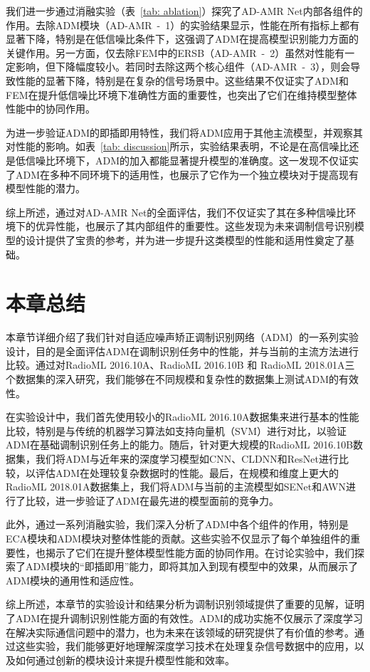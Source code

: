 我们进一步通过消融实验（表~\ref{tab: ablation}）探究了AD-AMR Net内部各组件的作用。去除ADM模块（AD-AMR~-~1）的实验结果显示，性能在所有指标上都有显著下降，特别是在低信噪比条件下，这强调了ADM在提高模型识别能力方面的关键作用。另一方面，仅去除FEM中的ERSB（AD-AMR~-~2）虽然对性能有一定影响，但下降幅度较小。若同时去除这两个核心组件（AD-AMR~-~3），则会导致性能的显著下降，特别是在复杂的信号场景中。这些结果不仅证实了ADM和FEM在提升低信噪比环境下准确性方面的重要性，也突出了它们在维持模型整体性能中的协同作用。

为进一步验证ADM的即插即用特性，我们将ADM应用于其他主流模型，并观察其对性能的影响。如表~\ref{tab: discussion}所示，实验结果表明，不论是在高信噪比还是低信噪比环境下，ADM的加入都能显著提升模型的准确度。这一发现不仅证实了ADM在多种不同环境下的适用性，也展示了它作为一个独立模块对于提高现有模型性能的潜力。

综上所述，通过对AD-AMR Net的全面评估，我们不仅证实了其在多种信噪比环境下的优异性能，也展示了其内部组件的重要性。这些发现为未来调制信号识别模型的设计提供了宝贵的参考，并为进一步提升这类模型的性能和适用性奠定了基础。

\section{本章总结}\label{sec:background}
本章节详细介绍了我们针对自适应噪声矫正调制识别网络（ADM）的一系列实验设计，目的是全面评估ADM在调制识别任务中的性能，并与当前的主流方法进行比较。通过对RadioML 2016.10A、RadioML 2016.10B 和 RadioML 2018.01A三个数据集的深入研究，我们能够在不同规模和复杂性的数据集上测试ADM的有效性。

在实验设计中，我们首先使用较小的RadioML 2016.10A数据集来进行基本的性能比较，特别是与传统的机器学习算法如支持向量机（SVM）进行对比，以验证ADM在基础调制识别任务上的能力。随后，针对更大规模的RadioML 2016.10B数据集，我们将ADM与近年来的深度学习模型如CNN、CLDNN和ResNet进行比较，以评估ADM在处理较复杂数据时的性能。最后，在规模和维度上更大的RadioML 2018.01A数据集上，我们将ADM与当前的主流模型如SENet和AWN进行了比较，进一步验证了ADM在最先进的模型面前的竞争力。

此外，通过一系列消融实验，我们深入分析了ADM中各个组件的作用，特别是ECA模块和ADM模块对整体性能的贡献。这些实验不仅显示了每个单独组件的重要性，也揭示了它们在提升整体模型性能方面的协同作用。在讨论实验中，我们探索了ADM模块的“即插即用”能力，即将其加入到现有模型中的效果，从而展示了ADM模块的通用性和适应性。

综上所述，本章节的实验设计和结果分析为调制识别领域提供了重要的见解，证明了ADM在提升调制识别性能方面的有效性。ADM的成功实施不仅展示了深度学习在解决实际通信问题中的潜力，也为未来在该领域的研究提供了有价值的参考。通过这些实验，我们能够更好地理解深度学习技术在处理复杂信号数据中的应用，以及如何通过创新的模块设计来提升模型性能和效率。
